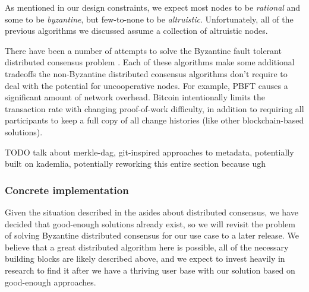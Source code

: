 \documentclass[a4paper,10pt]{article} \usepackage[utf8]{inputenc}
\newcommand{\todo}[1]{{\color{red} TODO #1 }}
\begin{document}
As mentioned in our design constraints, we expect most nodes to be {\em
rational} and some to be {\em byzantine}, but few-to-none to be {\em
altruistic}. Unfortunately, all of the previous algorithms we discussed assume a
collection of altruistic nodes.

There have been a number of attempts to solve the Byzantine fault tolerant
distributed consensus problem
\cite{bitcoin,pbft,qu,fab,fab-revisited,zyzzyva,rbft,
tangaroa,tendermint,aliph,hashgraph,honeybadger,algorand,casper,
tangle,avalanche,parsec,mickens-bft}. Each of these algorithms make some
additional tradeoffs the non-Byzantine distributed consensus algorithms don't
require to deal with the potential for uncooperative nodes. For example,
PBFT \cite{pbft} causes a significant amount of network overhead. Bitcoin
\cite{bitcoin} intentionally limits the transaction rate with changing
proof-of-work difficulty, in addition to requiring all participants to keep a
full copy of all change histories (like other blockchain-based
solutions).



\todo{talk about merkle-dag, git-inspired approaches to metadata, potentially
built on kademlia, potentially reworking this entire section because ugh}

\subsubsection{Concrete implementation}

Given the situation described in the asides about distributed consensus, we have
decided that good-enough solutions already exist, so we will revisit the
problem of solving Byzantine distributed consensus for our use
case to a later release. We believe that a great distributed algorithm here is
possible, all of the necessary building blocks are likely described above, and
we expect to invest heavily in research to find it after we have a thriving user
base with our solution based on good-enough approaches.
\end{document}

